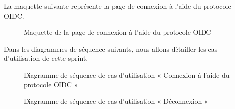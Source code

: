 La maquette suivante représente la page de connexion à l'aide du protocole OIDC.

\begin{figure}[H]
  \centering
  \caption{Maquette de la page de connexion à l'aide du protocole OIDC}
  \label{fig:design_OIDC}
\end{figure}

Dans les diagrammes de séquence suivants, nous allons détailler les cas d'utilisation de cette sprint.

\begin{figure}[H]
  \centering
  \caption{Diagramme de séquence de cas d'utilisation « Connexion à l'aide du protocole OIDC »}
  \label{fig:sequence_auth_OIDC}
\end{figure}

\begin{figure}[H]
  \centering
  \caption{Diagramme de séquence de cas d'utilisation « Déconnexion »}
  \label{fig:sequence_logout_OIDC}
\end{figure}


